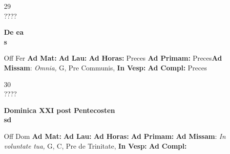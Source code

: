 \documentclass[10pt, openany]{book}
\begin{document}
    \begin{center}
        \begin{minipage}{3.5in}
            \vspace{2em}
            \begin{minipage}{0.5in}
                {\Huge 29} \\
                {\normalsize ????}
            \end{minipage}
            \begin{minipage}{3.0in}
                \textbf{ \large De ea \\
                \textnormal{\normalsize s}}

            \end{minipage}
            \begin{justify}Off Fer
                \textbf{Ad Mat: }
                \textbf{Ad Lau: }
                \textbf{Ad Horas: }Preces
                \textbf{Ad Primam: }Preces\textbf{Ad Missam}: \textit{Omnia,} G, Pre Communis, 
                \textbf{In Vesp: }
                \textbf{Ad Compl: }Preces
            \end{justify}
        \end{minipage}
    \end{center}

    \begin{center}
        \begin{minipage}{3.5in}
            \vspace{2em}
            \begin{minipage}{0.5in}
                {\Huge 30} \\
                {\normalsize ????}
            \end{minipage}
            \begin{minipage}{3.0in}
                \textbf{ \large Dominica XXI post Pentecosten \\
                \textnormal{\normalsize sd}}

            \end{minipage}
            \begin{justify}Off Dom
                \textbf{Ad Mat: }
                \textbf{Ad Lau: }
                \textbf{Ad Horas: }
                \textbf{Ad Primam: }\textbf{Ad Missam}: \textit{In voluntate tua,} G, C, Pre de Trinitate, 
                \textbf{In Vesp: }
                \textbf{Ad Compl: }
            \end{justify}
        \end{minipage}
    \end{center}
\end{document}
